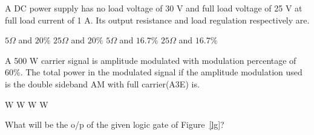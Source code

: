 \documentclass[a4, 12pt, addpoints]{exam}
\begin{document}
\begin{questions}
\question A DC power supply has no load voltage of 30 V and full load voltage of 25 V at full load current of 1 A. Its output resistance and load regulation respectively are. \\[0.3cm]
\begin{oneparchoices}
\choice $5 \Omega$ and $20 \%$ 
\choice $25 \Omega$ and $20 \%$
\choice $5 \Omega$ and $ 16.7 \%$
\choice $25 \Omega$ and $16.7 \%$
\end{oneparchoices} 
\question A 500 W carrier signal is amplitude modulated with modulation percentage of 60\%.  The total power in the modulated signal if the amplitude modulation used is  the double sideband AM with full carrier(A3E) is. \\[0.3cm]
 \begin{oneparchoices}
 W
 W
 W
 W
\end{oneparchoices} 
\question What will be the o/p of the given logic gate of Figure~\ref{lg}?
\begin{figure}[H]
\centering
{}
\end{figure}
\end{questions}
\end{document}

